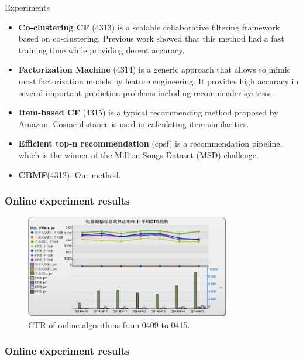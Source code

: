 \documentclass[xetex,mathserif,serif]{beamer}
\begin{document}
\begin{section}{Experiments}
\begin{frame}
\begin{itemize}
\item \textbf{Co-clustering CF} (4313) is a scalable collaborative filtering framework based on co-clustering. Previous work showed that this method had a fast training time while providing decent accuracy.
\item \textbf{Factorization Machine} (4314) is a generic approach that allows to mimic most factorization models by feature engineering. It provides high accuracy in several important prediction problems including recommender systems.
\item \textbf{Item-based CF} (4315) is a typical recommending method proposed by Amazon. Cosine distance is used in calculating item similarities.
\item \textbf{Efficient top-n recommendation} (cpsf) is a recommendation pipeline, which is the winner of the Million Songs Dataset (MSD) challenge.
\item \textbf{CBMF}(4312): Our method.

\end{itemize} 
\end{frame}
\begin{frame}
  \frametitle{Online experiment results}
\begin{figure}
\begin{center}
\includegraphics[width=0.8\textwidth]{fig/ctr0415.png}
\caption{ CTR of online algorithms from 0409 to 0415.}

\end{center}
\end{figure}
\end{frame}
\begin{frame}
  \frametitle{Online experiment results}
\begin{figure}
\begin{center}




\end{center}
\end{figure}
\end{frame}
\end{section}
\end{document}
